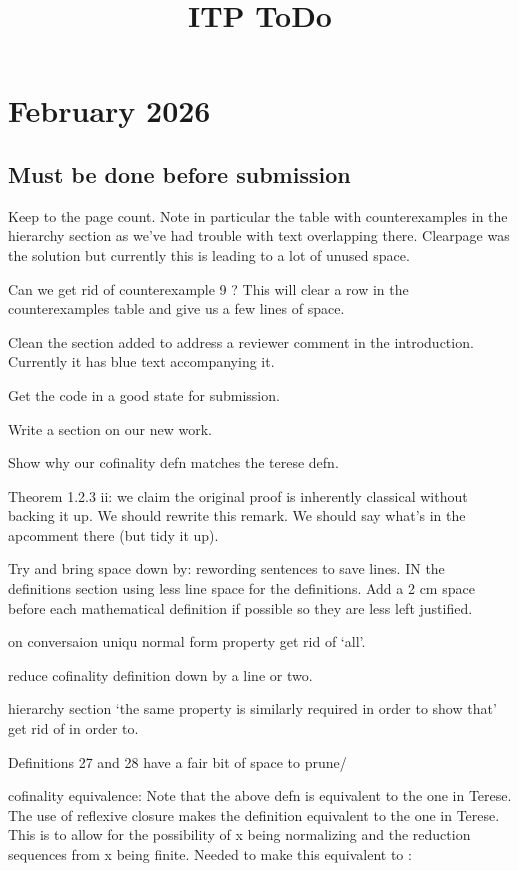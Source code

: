 \documentclass{article}
\newcommand{\cmark}{\ding{51}}%
\newcommand{\done}{\rlap{$\square$}{\raisebox{2pt}{\large\hspace{1pt}\cmark}}%
\hspace{-2.5pt}}
\begin{document}
\title{ITP ToDo}
\maketitle
\section*{February 2026}
\subsection*{Must be done before submission}
\begin{todolist}
    \item Keep to the page count. Note in particular the table with counterexamples in the hierarchy section as we've had trouble with text overlapping there. Clearpage was the solution but currently this is leading to a lot of unused space.
    \item [\done] Can we get rid of counterexample 9 ? This will clear a row in the counterexamples table and give us a few lines of space.
    \item [\done] Clean the section added to address a reviewer comment in the introduction. Currently it has blue text accompanying it.
    \item Get the code in a good state for submission.
    \item Write a section on our new work.
    \item Show why our cofinality defn matches the terese defn. 
    \item [\done] Theorem 1.2.3 ii: we claim the original proof is inherently classical without backing it up. We should rewrite this remark. We should say what's in the apcomment there (but tidy it up). 
    \item Try and bring space down by: rewording sentences to save lines. IN the definitions section using less line space for the definitions. Add a 2 cm space before each mathematical definition if possible so they are less left justified. 
    \item on conversaion uniqu normal form property get rid of `all'. 
    \item reduce cofinality definition down by a line or two. 
    \item hierarchy section    `the same property is similarly required in order to show that' get rid of in order to. 
    \item Definitions 27 and 28 have a fair bit of space to prune/ 
    \item cofinality equivalence: Note that the above defn is equivalent to the one in Terese. The use of reflexive closure makes the definition equivalent to the one in Terese. This is to allow for the possibility of x being normalizing and the reduction sequences from x being finite. Needed to make this equivalent to :


\end{todolist}
\end{document}
